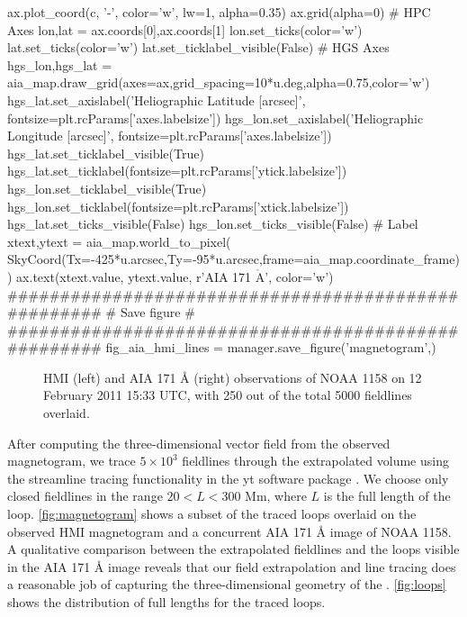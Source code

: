 \begin{pycode}[manager]
    ax.plot_coord(c, '-', color='w', lw=1, alpha=0.35)
ax.grid(alpha=0)
# HPC Axes
lon,lat = ax.coords[0],ax.coords[1]
lon.set_ticks(color='w')
lat.set_ticks(color='w')
lat.set_ticklabel_visible(False)
# HGS Axes
hgs_lon,hgs_lat = aia_map.draw_grid(axes=ax,grid_spacing=10*u.deg,alpha=0.75,color='w')
hgs_lat.set_axislabel('Heliographic Latitude [arcsec]',
                      fontsize=plt.rcParams['axes.labelsize'])
hgs_lon.set_axislabel('Heliographic Longitude [arcsec]',
                      fontsize=plt.rcParams['axes.labelsize'])
hgs_lat.set_ticklabel_visible(True)
hgs_lat.set_ticklabel(fontsize=plt.rcParams['ytick.labelsize'])
hgs_lon.set_ticklabel_visible(True)
hgs_lon.set_ticklabel(fontsize=plt.rcParams['xtick.labelsize'])
hgs_lat.set_ticks_visible(False)
hgs_lon.set_ticks_visible(False)
# Label
xtext,ytext = aia_map.world_to_pixel(
    SkyCoord(Tx=-425*u.arcsec,Ty=-95*u.arcsec,frame=aia_map.coordinate_frame))
ax.text(xtext.value, ytext.value, r'AIA 171 $\mathrm{\mathring{A}}$', color='w')
####################################################
#                  Save figure                     #
####################################################
fig_aia_hmi_lines = manager.save_figure('magnetogram',)
\end{pycode}
\begin{figure}
    \caption{HMI (left) and AIA 171 \AA{} (right) observations of \AR{} NOAA 1158 on 12 February 2011 15:33 UTC, with 250 out of the total 5000 fieldlines overlaid.}
    \label{fig:magnetogram}
\end{figure}

After computing the three-dimensional vector field from the observed magnetogram, we trace $5\times10^3$ fieldlines through the extrapolated volume using the streamline tracing functionality in the yt software package \citep{turk_yt_2011}. We choose only closed fieldlines in the range $20<L<300$ Mm, where $L$ is the full length of the loop. \autoref{fig:magnetogram} shows a subset of the traced loops overlaid on the observed HMI magnetogram and a concurrent AIA 171 \AA{} image of NOAA 1158. A qualitative comparison between the extrapolated fieldlines and the loops visible in the AIA 171 \AA{} image reveals that our field extrapolation and line tracing does a reasonable job of capturing the three-dimensional geometry of the \AR{}. \autoref{fig:loops} shows the distribution of full lengths for the traced loops.


